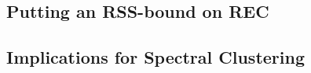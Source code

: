 \subsection{Putting an RSS-bound on REC}%
\label{sec:cons:bound}

\subsection{Implications for Spectral Clustering}%
\label{sec:cons:sc}

